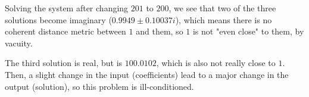 Solving the system after changing $201$ to $200$, we see that two of the three solutions become imaginary ($0.9949 \pm 0.10037i$), which means there is no coherent distance metric between $1$ and them, so $1$ is not "even close" to them, by vacuity.\bigskip

The third solution is real, but is $100.0102$, which is also not really close to $1$. Then, a slight change in the input (coefficients) lead to a major change in the output (solution), so this problem is ill-conditioned.